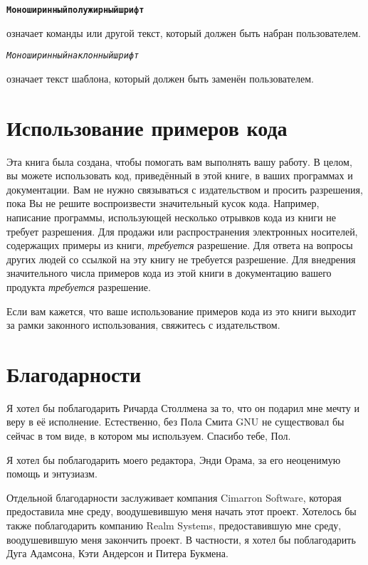 \begin{alltt}
\textbf{Моноширинный полужирный шрифт}
\end{alltt}
означает команды или другой текст, который должен быть набран
пользователем.

\begin{alltt}
\emph{Моноширинный наклонный шрифт}
\end{alltt}
означает текст шаблона, который должен быть заменён пользователем.

\section*{Использование примеров кода}
Эта книга была создана, чтобы помогать вам выполнять вашу работу. В
целом, вы можете использовать код, приведённый в этой книге, в ваших
программах и документации. Вам не нужно связываться с издательством и
просить разрешения, пока Вы не решите воспроизвести значительный кусок
кода. Например, написание программы, использующей несколько отрывков
кода из книги не требует разрешения. Для продажи или распространения
электронных носителей, содержащих примеры из книги, \textit{требуется}
разрешение. Для ответа на вопросы других людей со ссылкой на эту книгу
не требуется разрешение. Для внедрения значительного числа примеров
кода из этой книги в документацию вашего продукта \textit{требуется}
разрешение.

Если вам кажется, что ваше использование примеров кода из это книги
выходит за рамки законного использования, свяжитесь с издательством.

\section*{Благодарности}
Я хотел бы поблагодарить Ричарда Столлмена за то, что он подарил мне
мечту и веру в её исполнение. Естественно, без Пола Смита GNU
\GNUmake{} не существовал бы сейчас в том виде, в котором мы
используем. Спасибо тебе, Пол.

Я хотел бы поблагодарить моего редактора, Энди Орама, за его
неоценимую помощь и энтузиазм.

Отдельной благодарности заслуживает компания Cimarron Software,
которая предоставила мне среду, воодушевившую меня начать этот
проект. Хотелось бы также поблагодарить компанию Realm Systems,
предоставившую мне среду, воодушевившую меня закончить проект. В
частности, я хотел бы поблагодарить Дуга Адамсона, Кэти Андерсон и
Питера Букмена.

